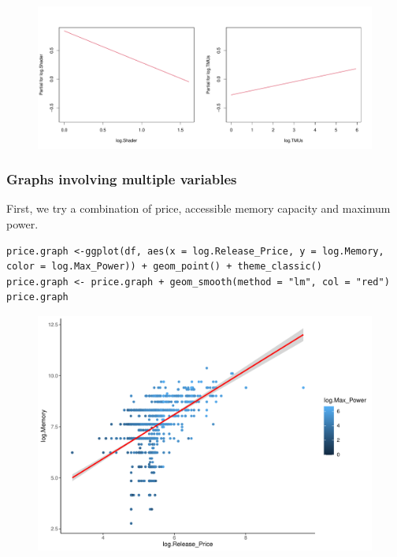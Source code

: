 \documentclass[a4paper]{article}
\begin{document}
\begin{figure}[H]
    \centering
    \includegraphics[keepaspectratio, width=1\textwidth, height=1\textheight]{LRM/Rplot6.pdf}
\end{figure}

\subsubsection{Graphs involving multiple variables}
First, we try a combination of price, accessible memory capacity and maximum power.
\begin{mdframed}[leftline=false,rightline=false,backgroundcolor=lightblue!10,nobreak=false]
    \begin{verbatim}
price.graph <-ggplot(df, aes(x = log.Release_Price, y = log.Memory, color = log.Max_Power)) + geom_point() + theme_classic()
price.graph <- price.graph + geom_smooth(method = "lm", col = "red")
price.graph
    \end{verbatim}
\end{mdframed}
\begin{figure}[H]
    \centering
    \includegraphics[keepaspectratio, width=1\textwidth, height=1\textheight]{LRM/Rplot7.pdf}
\end{figure}
\end{document}
